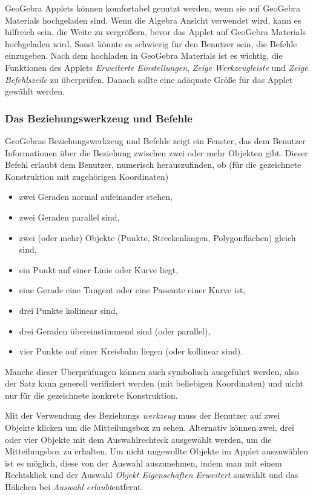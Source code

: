\documentclass{article}
\begin{document}
GeoGebra Applets können komfortabel genutzt werden, wenn sie auf GeoGebra Materials hochgeladen  sind.
Wenn die Algebra Ansicht verwendet wird, kann es hilfreich sein, die Weite zu vergrößern, bevor das Applet auf GeoGebra Materials hochgeladen wird. Sonst könnte es schwierig für den Benutzer sein, die Befehle einzugeben. Nach dem hochladen in GeoGebra Materials ist es wichtig, die Funktionen des Applets  \textit{Erweiterte Einstellungen},  \textit{Zeige Werkzeugleiste} und \textit{Zeige Befehlszeile} zu überprüfen. Danach sollte eine adäquate Größe für das Applet gewählt werden.


\subsubsection{Das Beziehungswerkzeug und Befehle}

GeoGebras Beziehungswerkzeug und Befehle zeigt ein Fenster, das dem Benutzer Informationen über die Beziehung zwischen zwei oder mehr Objekten gibt.
Dieser Befehl erlaubt dem Benutzer, numerisch herauszufinden, ob (für die gezeichnete Konstruktion mit zugehörigen Koordinaten)
\begin{itemize}
    \item zwei Geraden normal aufeinander stehen,
    \item zwei Geraden parallel sind,
    \item zwei (oder mehr) Objekte (Punkte, Streckenlängen, Polygonflächen) gleich sind,
    \item ein Punkt auf einer Linie oder Kurve liegt,
    \item eine Gerade eine Tangent oder eine Passante einer Kurve ist,
    \item drei Punkte kollinear sind,
    \item drei Geraden übereinstimmend sind (oder parallel),
    \item vier Punkte auf einer Kreisbahn liegen (oder kollinear sind).
\end{itemize}
Manche dieser Überprüfungen können auch symbolisch ausgeführt werden, also der Satz kann generell verifiziert werden (mit beliebigen Koordinaten) und nicht nur für die gezeichnete konkrete Konstruktion.

Mit der Verwendung des Beziehungs \textit{werkzeug} muss der Benutzer auf zwei Objekte klicken um die Mitteilungsbox zu sehen. Alternativ können zwei, drei oder vier Objekte mit dem Auswahlrechteck ausgewählt werden, um die Mitteilungsbox zu erhalten. Um nicht ungewollte Objekte im Applet auszuwählen ist es möglich, diese von der Auswahl auszunehmen, indem man mit einem Rechtsklick und der Auswahl \textit{Objekt Eigenschaften} \textit{Erweitert} auswählt und das Häkchen bei \textit{Auswahl erlaubt}entfernt.
\end{document}
